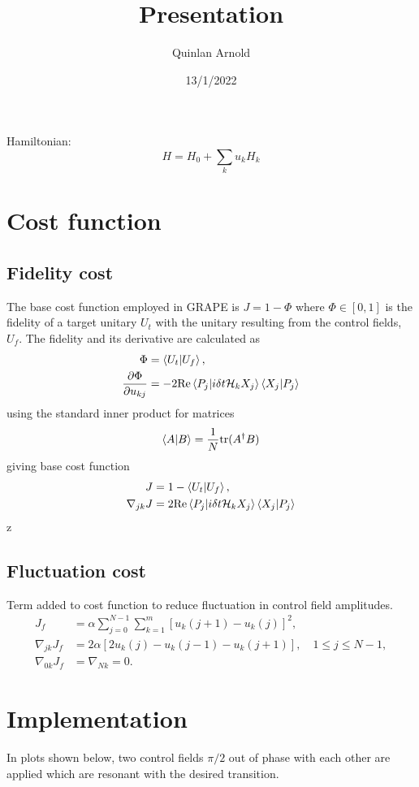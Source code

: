 \documentclass[12pt]{article}
\title{Presentation}
\author{Quinlan Arnold}
\date{13/1/2022}
\begin{document}
Hamiltonian:
\begin{equation}
    H=H_0+\sum_k u_k H_k
\end{equation}
\section{Cost function}
\subsection{Fidelity cost}
The base cost function employed in GRAPE is $J=1-\Phi$ where $\Phi\in [0,1]$ is  the fidelity of a target unitary $U_t$ with the unitary resulting from the control fields, $U_f$. The fidelity and its derivative are calculated as\cite{rowland_implementing_2012}
\begin{align}
    \Phi&=\bra{U_t}\ket{U_f},\\
    \frac{\partial\Phi}{\partial u_{kj}} &= -2\text{Re}\bra{P_j}\ket{i\delta t\mathcal{H}_k X_j}\bra{X_j}\ket{P_j}
\end{align}
using the standard inner product for matrices
\begin{equation}
    \bra{A}\ket{B} = \frac{1}{N}\text{tr}(A^\dagger B)
\end{equation}
giving base cost function 
\begin{align}
    J &= 1-\bra{U_t}\ket{U_f},\\
    \nabla_{jk}J &= 2\text{Re}\bra{P_j}\ket{i\delta t\mathcal{H}_k X_j}\bra{X_j}\ket{P_j}
\end{align}z

\subsection{Fluctuation cost}
Term added to cost function to reduce fluctuation in control field amplitudes.
\begin{align}
    J_f &= \alpha\sum_{j=0}^{N-1}\sum_{k=1}^m \left[u_k(j+1)-u_k(j)\right]^2,\\
    \nabla_{jk} J_f&= 2\alpha\left[2u_k(j) - u_k(j-1) - u_k(j+1)\right],\quad 1\leq j\leq N-1,\\
    \nabla_{0k}J_f &= \nabla_{Nk} = 0.
\end{align}

\section{Implementation}
In plots shown below, two control fields $\pi/2$ out of phase with each other are applied which are resonant with the desired transition.
\end{document}
